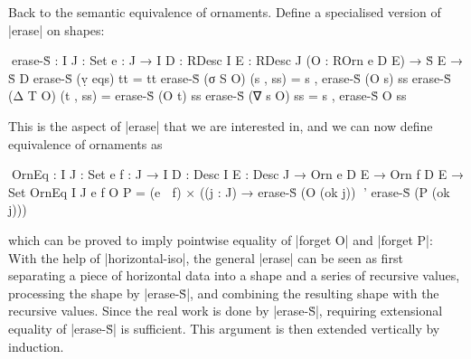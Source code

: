 Back to the semantic equivalence of ornaments.
Define a specialised version of |erase| on shapes:
\begin{code}
^^^erase-Ṡ :  {I J : Set} {e : J → I} {D : RDesc I} {E : RDesc J}
              (O : ROrn e D E) → Ṡ E → Ṡ D
erase-Ṡ (ṿ eqs)  tt        = tt
erase-Ṡ (σ S O)  (s , ss)  = s ,  erase-Ṡ (O s)  ss
erase-Ṡ (Δ T O)  (t , ss)  =      erase-Ṡ (O t)  ss
erase-Ṡ (∇ s O)  ss        = s ,  erase-Ṡ O      ss
\end{code}
This is the aspect of |erase| that we are interested in, and we can now define equivalence of ornaments as
\begin{code}
^^^OrnEq :  {I J : Set} {e f : J → I} {D : Desc I} {E : Desc J} →
            Orn e D E → Orn f D E → Set
OrnEq {I} {J} {e} {f} O P =
  (e ≐ f) × ((j : J) → erase-Ṡ (O (ok j)) ≊' erase-Ṡ (P (ok j)))
\end{code}
which can be proved to imply pointwise equality of |forget O| and |forget P|:
With the help of |horizontal-iso|, the general |erase| can be seen as first separating a piece of horizontal data into a shape and a series of recursive values, processing the shape by |erase-Ṡ|, and combining the resulting shape with the recursive values.
Since the real work is done by |erase-Ṡ|, requiring extensional equality of |erase-Ṡ| is sufficient.
This argument is then extended vertically by induction.

